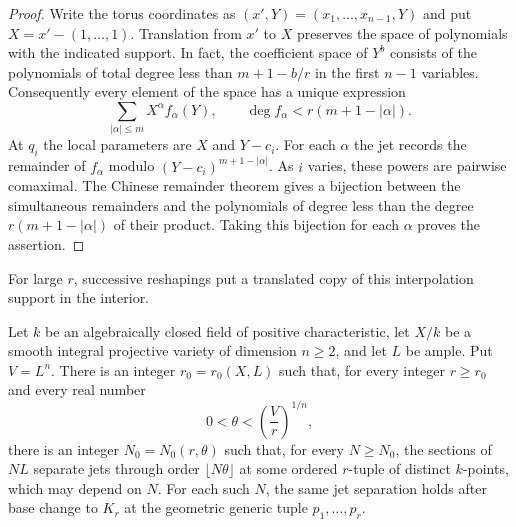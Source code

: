 \begin{proof}
Write the torus coordinates as $(x',Y)=(x_1,\ldots,x_{n-1},Y)$ and put $X=x'-(1,\ldots,1)$. Translation from $x'$ to $X$ preserves the space of polynomials with the indicated support. In fact, the coefficient space of $Y^b$ consists of the polynomials of total degree less than $m+1-b/r$ in the first $n-1$ variables. Consequently every element of the space has a unique expression
\[
 \sum_{|\alpha|\le m}X^\alpha f_\alpha(Y),
 \qquad
 \deg f_\alpha<r(m+1-|\alpha|).
\]
At $q_i$ the local parameters are $X$ and $Y-c_i$. For each $\alpha$ the jet records the remainder of $f_\alpha$ modulo $(Y-c_i)^{m+1-|\alpha|}$. As $i$ varies, these powers are pairwise comaximal. The Chinese remainder theorem gives a bijection between the simultaneous remainders and the polynomials of degree less than the degree $r(m+1-|\alpha|)$ of their product. Taking this bijection for each $\alpha$ proves the assertion.
\end{proof}

For large $r$, successive reshapings put a translated copy of this interpolation support in the interior.

\begin{proposition}\label{prop:generic-jets}
Let $k$ be an algebraically closed field of positive characteristic, let $X/k$ be a smooth integral projective variety of dimension $n\ge2$, and let $L$ be ample.  Put $V=L^n$.  There is an integer $r_0=r_0(X,L)$ such that, for every integer $r\ge r_0$ and every real number
\[
 0<\theta<\left(\frac Vr\right)^{1/n},
\]
there is an integer $N_0=N_0(r,\theta)$ such that, for every $N\ge N_0$, the sections of $NL$ separate jets through order $\lfloor N\theta\rfloor$ at some ordered $r$-tuple of distinct $k$-points, which may depend on $N$. For each such $N$, the same jet separation holds after base change to $K_r$ at the geometric generic tuple $p_1,\ldots,p_r$.
\end{proposition}

